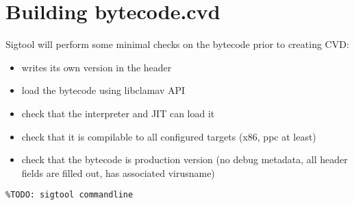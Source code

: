 \section{Building bytecode.cvd}
Sigtool will perform some minimal checks on the bytecode prior to creating CVD:
\begin{itemize}
\item writes its own version in the header
\item load the bytecode using libclamav API
\item check that the interpreter and JIT can load it
\item check that it is compilable to all configured targets (x86, ppc at least)
\item check that the bytecode is production version (no debug metadata, all
header fields are filled out, has associated virusname)
\end{itemize}
\begin{verbatim}
%TODO: sigtool commandline
\end{verbatim}
